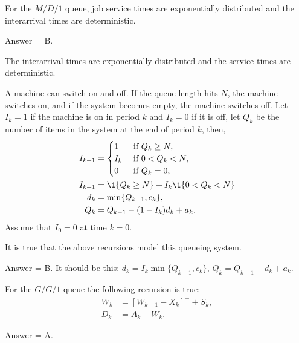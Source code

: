 \begin{exercise}[201703]
  For the $M/D/1$ queue, job service times are exponentially
  distributed and the interarrival times are deterministic.

\begin{solution}
    Answer = B.

    The interarrival times are exponentially distributed and the
    service times are deterministic.
\end{solution}
\end{exercise}

\begin{exercise}[201703] 
A machine can switch on and off. If the queue length
  hits $N$, the machine switches on, and if the system becomes empty,
  the machine switches off.  Let $I_k=1$ if the machine is on in
  period $k$ and $I_k=0$ if it is off, let $Q_k$ be the number of
  items in the system at the end of period $k$, then, 
    \begin{align*}
      I_{k+1} &=
      \begin{cases}
        1 & \text{ if } Q_{k} \geq N,\\
        I_k & \text{ if } 0< Q_{k} <N,\\
        0 & \text{ if }  Q_{k} =0,\\
      \end{cases}\\
  I_{k+1} &= \1{Q_k\geq N} + I_k \1{0<Q_k<N} \\
d_k &=\min\{Q_{k-1}, c_k\}, \\
Q_k &= Q_{k-1} - (1-I_k) d_k + a_k.
    \end{align*}
    Assume that $I_0 =0$ at time $k=0$. 

It is true that the above
    recursions model this queueing system.

\begin{solution}
    Answer = B.
It should be this: $d_k =I_k \min\{Q_{k-1}, c_k\}$,  $Q_k = Q_{k-1} - d_k + a_k$.

\end{solution}
\end{exercise}


\begin{exercise}[201703]
For the $G/G/1$ queue the following recursion is true: 
\begin{align*}
  W_{k} &= [W_{k-1} - X_k]^+ + S_k,\\
  D_k &= A_k + W_k.
\end{align*}

\begin{solution}
    Answer = A.
\end{solution}
\end{exercise}

